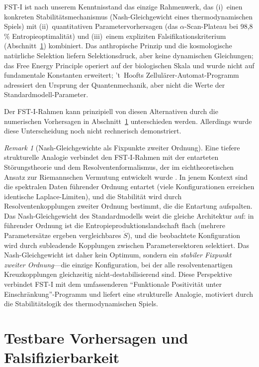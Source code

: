 \documentclass[12pt,a4paper]{article}
\theoremstyle{remark}
\newtheorem{remark}{Remark}
\begin{document}
FST-I ist nach unserem Kenntnisstand das einzige Rahmenwerk, das (i)~einen konkreten Stabilit\"atsmechanismus (Nash-Gleichgewicht eines thermodynamischen Spiels) mit (ii)~quantitativen Parametervorhersagen (das $\alpha$-Scan-Plateau bei 98,8\,\% Entropieoptimalit\"at) und (iii)~einem expliziten Falsifikationskriterium (Abschnitt~\ref{sec:predictions}) kombiniert. Das anthropische Prinzip und die kosmologische nat\"urliche Selektion liefern Selektionsdruck, aber keine dynamischen Gleichungen; das Free Energy Principle operiert auf der biologischen Skala und wurde nicht auf fundamentale Konstanten erweitert; 't~Hoofts Zellul\"arer-Automat-Programm adressiert den Ursprung der Quantenmechanik, aber nicht die Werte der Standardmodell-Parameter.

Der FST-I-Rahmen kann prinzipiell von diesen Alternativen durch die numerischen Vorhersagen in Abschnitt~\ref{sec:predictions} unterschieden werden. Allerdings wurde diese Unterscheidung noch nicht rechnerisch demonstriert.

\begin{remark}[Nash-Gleichgewichte als Fixpunkte zweiter Ordnung]
\label{rem:degenerate-perturbation}
Eine tiefere strukturelle Analogie verbindet den FST-I-Rahmen mit der entarteten St\"orungstheorie und dem Resolventenformalismus, der im eichtheoretischen Ansatz zur Riemannschen Vermutung entwickelt wurde \citep{GeigerRH2026b}. In jenem Kontext sind die spektralen Daten f\"uhrender Ordnung entartet (viele Konfigurationen erreichen identische Laplace-Limiten), und die Stabilit\"at wird durch Resolventenkopplungen zweiter Ordnung bestimmt, die die Entartung aufspalten. Das Nash-Gleichgewicht des Standardmodells weist die gleiche Architektur auf: in f\"uhrender Ordnung ist die Entropieproduktionslandschaft flach (mehrere Parameters\"atze ergeben vergleichbares $\dot{S}$), und die beobachtete Konfiguration wird durch subleadende Kopplungen zwischen Parametersektoren selektiert. Das Nash-Gleichgewicht ist daher kein Optimum, sondern ein \emph{stabiler Fixpunkt zweiter Ordnung}---die einzige Konfiguration, bei der alle resolventenartigen Kreuzkopplungen gleichzeitig nicht-destabilisierend sind. Diese Perspektive verbindet FST-I mit dem umfassenderen ``Funktionale Positivit\"at unter Einschr\"ankung''-Programm und liefert eine strukturelle Analogie, motiviert durch die Stabilit\"atslogik des thermodynamischen Spiels.
\end{remark}

\section{Testbare Vorhersagen und Falsifizierbarkeit}
\label{sec:predictions}
\end{document}
